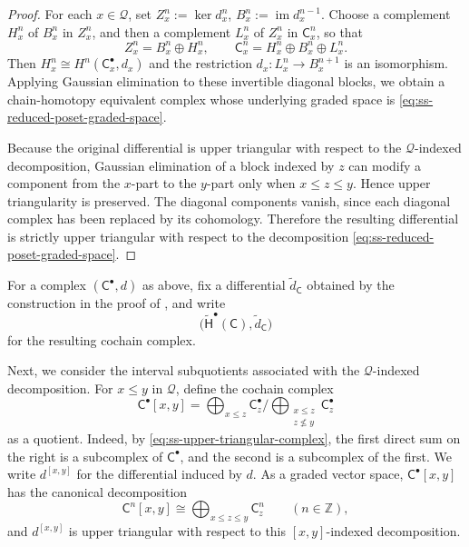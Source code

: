 \begin{proof}
For each $x\in\mathcal Q$, set
$Z_x^n:=\ker d_x^n$, $B_x^n:=\operatorname{im} d_x^{n-1}$.
Choose a complement $H_x^n$ of $B_x^n$ in $Z_x^n$, and then a complement
$L_x^n$ of $Z_x^n$ in $\mathsf C_x^n$, so that
\[
Z_x^n=B_x^n\oplus H_x^n,
\qquad
\mathsf C_x^n=H_x^n\oplus B_x^n\oplus L_x^n.
\]
Then $H_x^n\cong H^n(\mathsf C_x^\bullet,d_x)$ and
the restriction $d_x\colon L_x^n\to B_x^{n+1}$ is an isomorphism.
Applying Gaussian elimination to these invertible diagonal blocks, we obtain
a chain-homotopy equivalent complex whose underlying graded space is
\eqref{eq:ss-reduced-poset-graded-space}.

Because the original differential is upper triangular with respect to
the $\mathcal Q$-indexed decomposition, Gaussian elimination of a block
indexed by $z$ can modify a component from the $x$-part to the $y$-part
only when $x\leq z\leq y$.  Hence upper triangularity is preserved.
The diagonal components vanish, since each diagonal complex has been
replaced by its cohomology.  
Therefore the resulting differential is strictly upper triangular with
respect to the decomposition
\eqref{eq:ss-reduced-poset-graded-space}.
\end{proof}


For a complex $(\mathsf C^\bullet,d)$ as above, fix a differential
$\widetilde d_{\mathsf C}$ obtained by the construction in the proof of
, and write
\begin{equation}
\label{eq:ss-upper-triangular-reduction-notation}
\bigl(
\widetilde{\mathsf H}^\bullet(\mathsf C),
\widetilde d_{\mathsf C}
\bigr)
\end{equation}
for the resulting cochain complex.

Next, we consider the interval subquotients associated with the
$\mathcal Q$-indexed decomposition.  For $x\leq y$ in $\mathcal Q$,
define the cochain complex
\begin{equation}
\label{eq:ss-poset-interval-complex}
\mathsf C^\bullet[x,y]
=
\bigoplus_{x\leq z}\mathsf C_z^\bullet
\bigg/
\bigoplus_{\substack{x\leq z\\ z\not\leq y}}
\mathsf C_z^\bullet
\end{equation}
as a quotient. 
Indeed, by \eqref{eq:ss-upper-triangular-complex}, the first direct
sum on the right is a subcomplex of $\mathsf C^\bullet$, and the
second is a subcomplex of the first.  We write $d^{[x,y]}$ for the
differential induced by $d$.  As a graded vector space,
$\mathsf C^\bullet[x,y]$ has the canonical decomposition
\begin{equation}
\label{eq:ss-poset-interval-decomposition}
\mathsf C^n[x,y]
\cong
\bigoplus_{x\leq z\leq y}\mathsf C_z^n
\qquad
(n\in\mathbb Z),
\end{equation}
and $d^{[x,y]}$ is upper triangular with respect to this
$[x,y]$-indexed decomposition.


